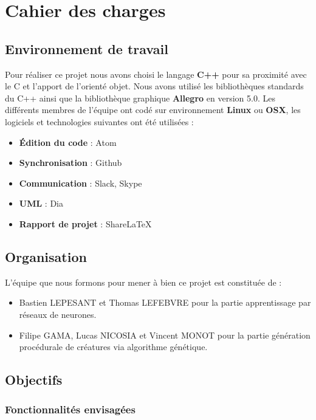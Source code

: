 \section{Cahier des charges}
    \subsection{Environnement de travail}
        Pour réaliser ce projet nous avons choisi le langage \textbf{C++} pour sa proximité avec le C et l'apport de l'orienté objet.
        Nous avons utilisé les bibliothèques standards du C++ ainsi
        que la bibliothèque graphique \textbf{Allegro} en version 5.0.
        Les différents membres de l'équipe ont codé sur environnement \textbf{Linux} ou \textbf{OSX}, les logiciels et technologies suivantes ont été utilisées :
        
        \begin{itemize}
            \item \textbf{Édition du code} : Atom 
            \item \textbf{Synchronisation} : Github  
            \item \textbf{Communication} : Slack, Skype
            \item \textbf{UML} : Dia
            \item \textbf{Rapport de projet} : ShareLaTeX 
        \end{itemize}

    \subsection{Organisation}
        L'équipe que nous formons pour mener à bien ce projet est constituée de :
        
        \begin{itemize}
            \item Bastien LEPESANT et Thomas LEFEBVRE pour la partie apprentissage par réseaux de neurones.
            \item Filipe GAMA, Lucas NICOSIA et Vincent MONOT pour la partie génération procédurale de créatures via algorithme génétique.

        \end{itemize}
        
    \subsection{Objectifs}
        \subsubsection{Fonctionnalités envisagées}
